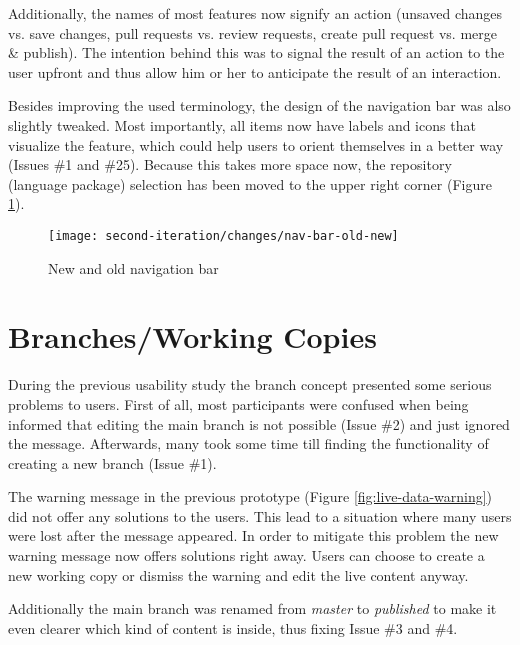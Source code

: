 Additionally, the names of most features now signify an action (unsaved changes vs. save changes, pull requests vs. review requests, create pull request vs. merge \& publish). The intention behind this was to signal the result of an action to the user upfront and thus allow him or her to anticipate the result of an interaction.

Besides improving the used terminology, the design of the navigation bar was also slightly tweaked. Most importantly, all items now have labels and icons that visualize the feature, which could help users to orient themselves in a better way (Issues \#1 and \#25). Because this takes more space now, the repository (language package) selection has been moved to the upper right corner (Figure \ref{fig:nav-bar-old-new}).

\begin{figure}[h!]
 \centering
 \texttt{[image: second-iteration/changes/nav-bar-old-new]}
 \caption{New and old navigation bar}
 \label{fig:nav-bar-old-new}
\end{figure}

\section{Branches/Working Copies}
During the previous usability study the branch concept presented some serious problems to users. First of all, most participants were confused when being informed that editing the main branch is not possible (Issue \#2) and just ignored the message. Afterwards, many took some time till finding the functionality of creating a new branch (Issue \#1).

The warning message in the previous prototype (Figure \ref{fig:live-data-warning}) did not offer any solutions to the users. This lead to a situation where many users were lost after the message appeared. In order to mitigate this problem the new warning message now offers solutions right away. Users can choose to create a new working copy or dismiss the warning and edit the live content anyway.

Additionally the main branch was renamed from \emph{master} to \emph{published} to make it even clearer which kind of content is inside, thus fixing Issue \#3 and \#4.




